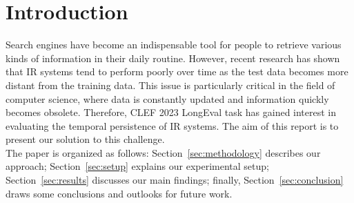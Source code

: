 \section{Introduction}
\label{sec:introduction}

Search engines have become an indispensable tool for people to retrieve various kinds of information in their daily 
routine. However, recent research has shown that \ac{IR} systems tend to perform poorly over time
 as the test data becomes more distant from the training data. This issue is particularly critical in the field of 
 computer science, where data is constantly updated and information quickly becomes obsolete. Therefore, \ac{CLEF} 2023 LongEval task has gained interest in evaluating the temporal persistence of \ac{IR} systems. The aim of this report is to present our solution to this challenge.
\\The paper is organized as follows: Section~\ref{sec:methodology} describes our approach; Section~\ref{sec:setup} 
explains our experimental setup; Section~\ref{sec:results} discusses our main findings; finally, 
Section~\ref{sec:conclusion} draws some conclusions and outlooks for future work.